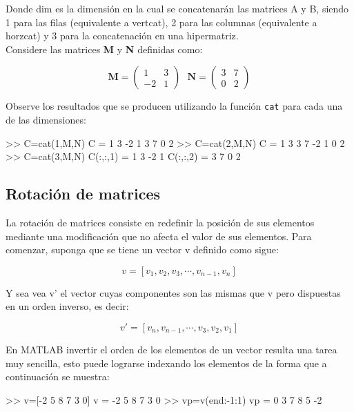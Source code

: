 Donde dim es la dimensión en la cual se concatenarán las matrices A y B,
siendo 1 para las filas (equivalente a vertcat), 2 para las columnas
(equivalente a horzcat) y 3 para la concatenación en una hipermatriz.\\

Considere las matrices \textbf{M} y \textbf{N} definidas como:


$$
\textbf{M}=
\begin{pmatrix}
    1 & 3 \\
    -2 & 1 
\end{pmatrix}
\,\,\,\,
\textbf{N}=
\begin{pmatrix}
    3 & 7 \\
    0 & 2
\end{pmatrix}
$$

Observe los resultados que se producen utilizando la función
\texttt{cat} para cada una de las dimensiones:

\begin{matlab}
>> C=cat(1,M,N)
C =
     1     3
    -2     1
     3     7
     0     2
>> C=cat(2,M,N)
C =
     1     3     3     7
    -2     1     0     2
>> C=cat(3,M,N)
C(:,:,1) =
     1     3
    -2     1
C(:,:,2) =
     3     7
     0     2
\end{matlab}

\subsection{Rotación de matrices}\label{rotacion-de-matrices}

La rotación de matrices consiste en redefinir la posición de sus
elementos mediante una modificación que no afecta el valor de sus
elementos. Para comenzar, suponga que se tiene un vector v definido como
sigue:

$$v = [ v_1 , v_2 , v_3, \cdots , v_{n-1} ,v_n ]$$

Y sea vea v' el vector cuyas componentes son las mismas que v pero
dispuestas en un orden inverso, es decir:

$$v\prime = [v_n , v_{n-1} ,\cdots , v_3 ,v_2 ,v_1 ]$$

En MATLAB invertir el orden de los elementos de un vector resulta una
tarea muy sencilla, esto puede lograrse indexando los elementos de la
forma que a continuación se muestra:

\begin{matlab}
>> v=[-2 5 8 7 3 0] %
v =
    -2     5     8     7     3     0
>> vp=v(end:-1:1) %
vp =
     0     3     7     8     5    -2
\end{matlab}


